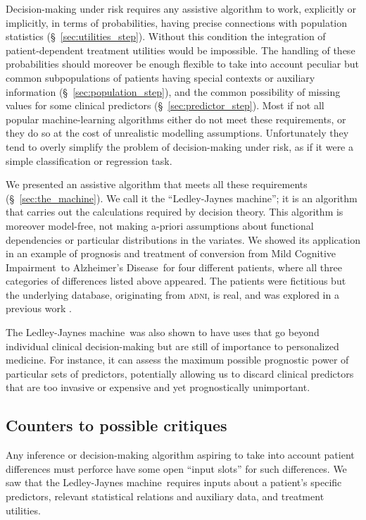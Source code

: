 \documentclass[utf8]{FrontiersinHarvard} %
\newcommand*{\sect}{\S}%
\renewcommand*{\|}[1][]{\nonscript\:#1\vert\nonscript\:\mathopen{}}
\newcommand*{\ad}{Alzheimer's Disease}
\newcommand*{\mci}{Mild Cognitive Impairment}
\newcommand*{\ljm}{Ledley-Jaynes machine}
\newcommand*{\adni}{\textsc{adni}}
\begin{document}
Decision-making under risk requires any assistive algorithm to work, explicitly or implicitly, in terms of probabilities, having precise connections with population statistics (\sect~\ref{sec:utilities_step}). Without this condition the integration of patient-dependent treatment utilities would be impossible. The handling of these probabilities should moreover be enough flexible to take into account peculiar but common subpopulations of patients having special contexts or auxiliary information (\sect~\ref{sec:population_step}), and the common possibility of missing values for some clinical predictors (\sect~\ref{sec:predictor_step}). Most if not all popular machine-learning algorithms either do not meet these requirements, or they do so at the cost of unrealistic modelling assumptions. Unfortunately they tend to overly simplify the problem of decision-making under risk, as if it were a simple classification or regression task.

We presented an assistive algorithm that meets all these requirements (\sect~\ref{sec:the_machine}). We call it the \enquote{\ljm}; it is an algorithm that carries out the calculations required by decision theory. This algorithm is moreover model-free, not making a-priori assumptions about functional dependencies or particular distributions in the variates. We showed its application in an example of prognosis and treatment of conversion from \mci\ to \ad\ for four different patients, where all three categories of differences listed above appeared. The patients were fictitious but the underlying database, originating from \adni, is real, and was explored in a previous work \citep{ryeetal2022}.

The \ljm\ was also shown to have uses that go beyond individual clinical decision-making but are still of importance to personalized medicine. For instance, it can assess the maximum possible prognostic power of particular sets of predictors, potentially allowing us to discard clinical predictors that are too invasive or expensive and yet prognostically unimportant.

\subsection{Counters to possible critiques}
\label{sec:critics}

Any inference or decision-making algorithm aspiring to take into account patient differences must perforce have some open \enquote{input slots} for such differences. We saw that the \ljm\ requires inputs about a patient's specific predictors, relevant statistical relations and auxiliary data, and treatment utilities.
\end{document}
